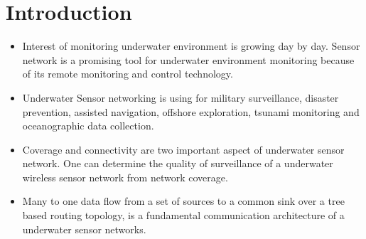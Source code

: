 \documentclass[11pt]{article}
\begin{document}
\section{Introduction}
\label{sec:intro}
\begin{itemize}[noitemsep]

\item Interest of monitoring underwater environment is growing day by day. Sensor network is a promising tool for underwater environment monitoring because of its remote monitoring and control technology. \item Underwater Sensor networking is using for military surveillance\cite{kong2005building}, disaster prevention, assisted navigation, offshore exploration, tsunami monitoring and oceanographic data collection. 
\item Coverage and connectivity are two important aspect of underwater sensor network. One can determine the quality of surveillance of a underwater wireless sensor network from network coverage. 
\item Many to one data flow from a set of sources to a common sink over a tree based routing topology, is a fundamental communication architecture of a underwater sensor networks.
\end{itemize}
\end{document}
